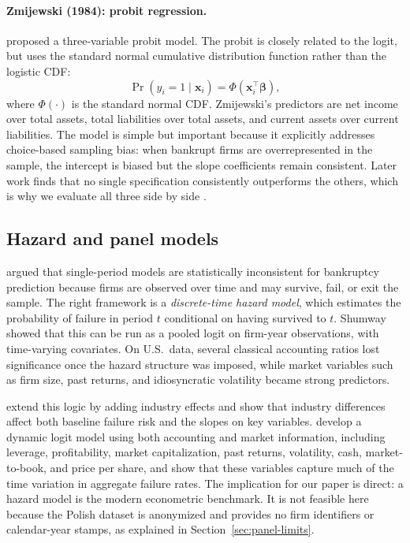 \documentclass[12pt,a4paper]{article}
\begin{document}
\paragraph{Zmijewski (1984): probit regression.}
\cite{zmijewski1984} proposed a three-variable probit model. The probit is
closely related to the logit, but uses the standard normal cumulative
distribution function rather than the logistic CDF:
\begin{equation}
\Pr(y_i = 1 \mid \mathbf{x}_i) =
\Phi\!\left(\mathbf{x}_i^\top \boldsymbol{\beta}\right),
\label{eq:probit}
\end{equation}
where $\Phi(\cdot)$ is the standard normal CDF. Zmijewski's predictors are net
income over total assets, total liabilities over total assets, and current
assets over current liabilities. The model is simple but important because it explicitly addresses choice-based
sampling bias: when bankrupt firms are overrepresented in the sample, the
intercept is biased but the slope coefficients remain consistent. Later work
finds that no single specification consistently outperforms the others, which
is why we evaluate all three side by side \citep{mossman1998}.

\subsection{Hazard and panel models}

\cite{shumway2001} argued that single-period models are statistically
inconsistent for bankruptcy prediction because firms are observed over time
and may survive, fail, or exit the sample. The right framework is a
\textit{discrete-time hazard model}, which estimates the probability of
failure in period $t$ conditional on having survived to $t$. Shumway showed
that this can be run as a pooled logit on firm-year observations, with
time-varying covariates. On U.S.\ data, several classical accounting ratios
lost significance once the hazard structure was imposed, while market variables
such as firm size, past returns, and idiosyncratic volatility became strong
predictors.

\cite{chava2004} extend this logic by adding industry effects and show that
industry differences affect both baseline failure risk and the slopes on key
variables. \cite{campbell2008} develop a dynamic logit model using both
accounting and market information, including leverage, profitability, market
capitalization, past returns, volatility, cash, market-to-book, and price per
share, and show that these variables capture much of the time variation in
aggregate failure rates. The implication for our paper is direct: a hazard model is the modern
econometric benchmark. It is not feasible here because the Polish dataset is
anonymized and provides no firm identifiers or calendar-year stamps, as
explained in Section~\ref{sec:panel-limits}.
\end{document}
